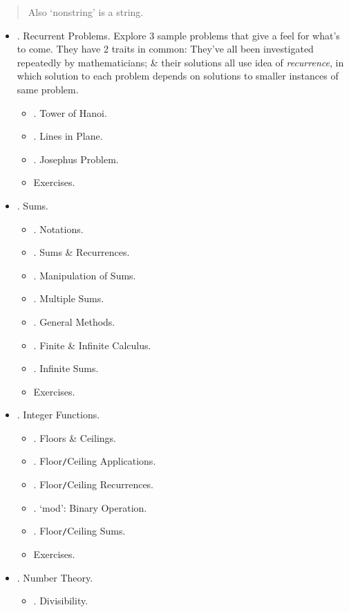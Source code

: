 \documentclass{article}
\begin{document}
\begin{enumerate}
\begin{quote}
		Also `nonstring' is a string.
	\end{quote}
	
	\begin{itemize}
		\item {. Recurrent Problems.} Explore 3 sample problems that give a feel for what's to come. They have 2 traits in common: They've all been investigated repeatedly by mathematicians; \& their solutions all use idea of {\it recurrence}, in which solution to each problem depends on solutions to smaller instances of same problem.
		\begin{itemize}
			\item {. Tower of Hanoi.}
			\item {. Lines in Plane.}
			\item {. Josephus Problem.}
			\item {\sf Exercises.}
		\end{itemize}
		\item {. Sums.}
		\begin{itemize}
			\item {. Notations.}
			\item {. Sums \& Recurrences.}
			\item {. Manipulation of Sums.}
			\item {. Multiple Sums.}
			\item {. General Methods.}
			\item {. Finite \& Infinite Calculus.}
			\item {. Infinite Sums.}
			\item {\sf Exercises.}
		\end{itemize}
		\item {. Integer Functions.}
		\begin{itemize}
			\item {. Floors \& Ceilings.}
			\item {. Floor{\tt/}Ceiling Applications.}
			\item {. Floor{\tt/}Ceiling Recurrences.}
			\item {. `mod': Binary Operation.}
			\item {. Floor{\tt/}Ceiling Sums.}
			\item {\sf Exercises.}
		\end{itemize}
		\item {. Number Theory.}
		\begin{itemize}
			\item {. Divisibility.}

\end{itemize}
\end{itemize}
\end{enumerate}
\end{document}
